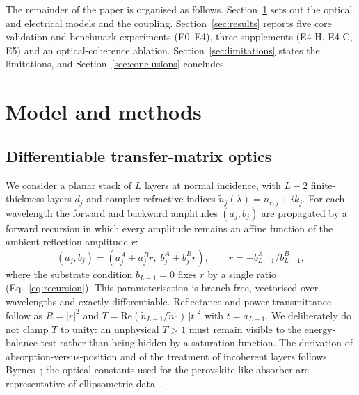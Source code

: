 \documentclass[preprint,12pt]{elsarticle}
\begin{document}
The remainder of the paper is organised as follows. Section~\ref{sec:methods}
sets out the optical and electrical models and the coupling.
Section~\ref{sec:results} reports five core validation and benchmark
experiments (E0--E4), three supplements (E4-H, E4-C, E5) and an
optical-coherence ablation. Section~\ref{sec:limitations} states the limitations, and
Section~\ref{sec:conclusions} concludes.

\section{Model and methods}
\label{sec:methods}

\subsection{Differentiable transfer-matrix optics}
\label{sec:optics}

We consider a planar stack of $L$ layers at normal incidence, with $L-2$
finite-thickness layers $d_j$ and complex refractive indices
$\tilde n_j(\lambda)=n_{r,j}+ik_j$. For each wavelength the forward and
backward amplitudes $(a_j,b_j)$ are propagated by a forward recursion in
which every amplitude remains an affine function of the ambient reflection
amplitude $r$:
\begin{equation}
  (a_j,b_j)=(a_j^{A}+a_j^{B}r,\; b_j^{A}+b_j^{B}r),\qquad
  r=-b^{A}_{L-1}/b^{B}_{L-1},
  \label{eq:recursion}
\end{equation}
where the substrate condition $b_{L-1}=0$ fixes $r$ by a single ratio
(Eq.~\eqref{eq:recursion}). This parameterisation is branch-free,
vectorised over wavelengths and exactly differentiable. Reflectance and power transmittance follow as
$R=|r|^2$ and $T=\mathrm{Re}(\tilde n_{L-1}/\tilde n_0)\,|t|^2$ with
$t=a_{L-1}$. We deliberately do not clamp $T$ to unity: an unphysical
$T>1$ must remain visible to the energy-balance test rather than being hidden
by a saturation function. The derivation of absorption-versus-position and
of the treatment of incoherent layers follows Byrnes~\cite{byrnes2016}; the
optical constants used for the perovskite-like absorber are representative of
ellipsometric data~\cite{loper2015}.
\end{document}
